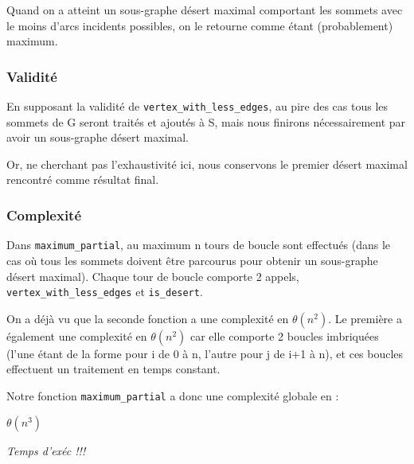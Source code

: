 Quand on a atteint un sous-graphe désert maximal comportant les sommets avec le moins d'arcs incidents possibles, on le retourne comme étant (probablement) maximum. 

\subsubsection{Validité}

En supposant la validité de \verb|vertex_with_less_edges|, au pire des cas tous les sommets de G seront traités et ajoutés à S, mais nous finirons nécessairement par avoir un sous-graphe désert maximal. 

Or, ne cherchant pas l'exhaustivité ici, nous conservons le premier désert maximal rencontré comme résultat final. 

\subsubsection{Complexité}

Dans \verb|maximum_partial|, au maximum n tours de boucle sont effectués (dans le cas où tous les sommets doivent être parcourus pour obtenir un sous-graphe désert maximal). Chaque tour de boucle comporte 2 appels, \verb|vertex_with_less_edges| et \verb|is_desert|.

On a déjà vu que la seconde fonction a une complexité en $\theta(n^2)$. Le première a également une complexité en $\theta(n^2)$ car elle comporte 2 boucles imbriquées (l'une étant de  la forme pour i de 0 à n, l'autre pour j de i+1 à n), et ces boucles effectuent un traitement en temps constant. 

Notre fonction \verb|maximum_partial| a donc une complexité globale en :

$\theta(n^3)$

\emph{Temps d'exéc !!!} 